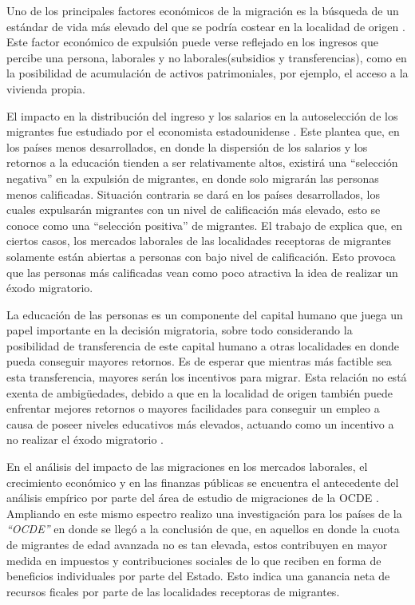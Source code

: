\documentclass[12pt,a4paper]{article}
\begin{document}
Uno de los principales factores económicos de la migración es la búsqueda de un estándar de vida más elevado del que se podría costear en la localidad de origen \parencite{simpson_demographic_2017}. Este factor económico de expulsión  puede verse reflejado en los ingresos que percibe una persona, laborales y no laborales(subsidios y transferencias), como en la posibilidad de acumulación de activos patrimoniales, por ejemplo, el acceso a la vivienda propia. 

El impacto en la distribución del ingreso y los salarios en la autoselección de los migrantes fue estudiado por el economista estadounidense \textcite{borjas_self-selection_1987}. Este plantea que, en los países menos desarrollados, en donde la dispersión de los salarios y los retornos a la educación tienden a ser relativamente altos, existirá una ``selección negativa'' en la expulsión de migrantes, en donde solo migrarán las personas menos calificadas. Situación contraria se dará en los países desarrollados, los cuales expulsarán migrantes con un nivel de calificación más elevado, esto se conoce como una ``selección positiva'' de migrantes. El trabajo de \textcite{stark_migration_1991} explica que, en ciertos casos, los mercados laborales de las localidades receptoras de migrantes solamente están abiertas a personas con bajo nivel de calificación. Esto provoca que las personas más calificadas vean como poco atractiva la idea de realizar un éxodo migratorio.

La educación de las personas es un componente del capital humano que juega un  papel importante en la decisión migratoria, sobre todo considerando la posibilidad de transferencia de este capital humano a otras localidades en donde pueda conseguir mayores retornos. Es de esperar que mientras más factible sea esta transferencia, mayores serán los incentivos para migrar. Esta relación no está exenta de ambigüedades, debido a que en la localidad de origen también puede enfrentar mejores retornos o mayores facilidades para conseguir un empleo a causa de poseer niveles educativos más elevados, actuando como un incentivo a no realizar el éxodo migratorio \parencite{danzer_economic_2008}.

En el análisis del impacto de las migraciones en los mercados laborales, el crecimiento económico y en las finanzas públicas se encuentra el antecedente del análisis empírico por parte del área de estudio de migraciones de la OCDE \textcite{dumont_is_2014}. Ampliando en este mismo espectro \textcite{liebig_fiscal_2013} realizo una investigación para los países de la \textit{``OCDE''} en donde se llegó a la conclusión de que, en aquellos en donde la cuota de migrantes de edad avanzada no es tan elevada, estos contribuyen en mayor medida en impuestos y contribuciones sociales de lo que reciben en forma de beneficios individuales por parte del Estado. Esto indica una ganancia neta de recursos ficales por parte de las localidades receptoras de migrantes.
\end{document}
